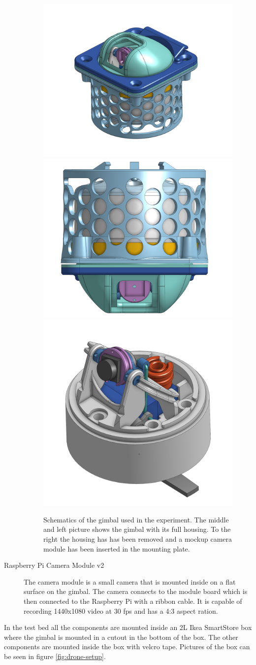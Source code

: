 \documentclass[nofilelist]{cslthse-msc}
\begin{document}
\begin{description}
   \begin{figure}[htp]
      \centering
      \includegraphics[width=.3\textwidth]{images/gimbal-1.png}\hfill
      \includegraphics[width=.3\textwidth]{images/gimbal-2.png}\hfill
      \includegraphics[width=.3\textwidth]{images/gimbal-3.png}
      \caption{Schematics of the gimbal used in the experiment. The middle and left picture shows the gimbal with its full housing. To the right the housing has has been removed and a mockup camera module has been inserted in the mounting plate.}
      \label{fig:gimbal-pics}
   \end{figure}
   
   \item[Raspberry Pi Camera Module v2] The camera module is a small camera that is mounted inside on a flat surface on the gimbal. The camera connects to the module board which is then connected to the Raspberry Pi with a ribbon cable. It is capable of recording 1440x1080 video at 30 fps and has a 4:3 aspect ration.

\end{description}

In the test bed all the components are mounted inside an 2L Ikea SmartStore box where the gimbal is mounted in a cutout in the bottom of the box. The other components are mounted inside the box with velcro tape. Pictures of the box can be seen in figure \ref{fig:drone-setup}. 
\end{document}
